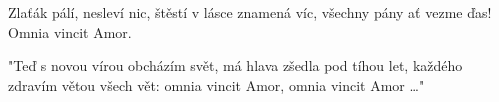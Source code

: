 \repeatingchorus{}
\beginchorus{}
\chordsoff{}
Zlaťák pálí, nesleví nic,
štěstí v lásce znamená víc,
všechny pány ať vezme ďas! 
Omnia vincit Amor.
\chordson{}
\endchorus{}

\beginverse{}
\chordsoff{}
"Teď s novou vírou obcházím svět,
má hlava zšedla pod tíhou let,
každého zdravím větou všech vět:
omnia vincit Amor, omnia vincit Amor \ldots{}"
\chordson{}
\endverse{}

\endsong{}
